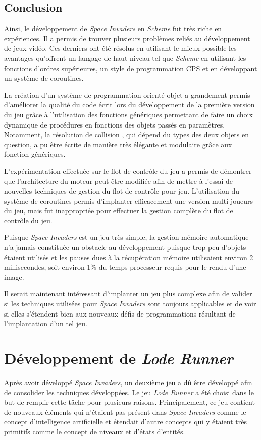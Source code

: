 \documentclass[12pt,twoside,letterpaper,francais]{book}
\newcommand{\lr}{{\textit{Lode Runner }}}
\newcommand{\si}{{\textit{Space Invaders }}}
\newcommand{\Schemelang}{{\textit{Scheme }}}
\begin{document}
\FloatBarrier
\subsection{Conclusion}
Ainsi, le développement de \si en \Schemelang fut très riche en
expériences. Il a permis de trouver plusieurs problèmes reliés au
développement de jeux vidéo. Ces derniers ont été résolus en utilisant
le mieux possible les avantages qu'offrent un langage de haut niveau
tel que \Schemelang en utilisant les fonctions d'ordres supérieures, un
style de programmation CPS et en développant un système de coroutines.

La création d'un système de programmation orienté objet a grandement
permis d'améliorer la qualité du code écrit lors du développement de
la première version du jeu grâce à l'utilisation des fonctions
génériques permettant de faire un choix dynamique de procédures en
fonctions des objets passés en paramètres. Notamment, la résolution de
collision , qui dépend du types des deux objets en question, a pu être
écrite de manière très élégante et modulaire grâce aux fonction
génériques.

L'expérimentation effectuée sur le flot de contrôle du jeu a permis de
démontrer que l'architecture du moteur peut être modifiée afin de
mettre à l'essai de nouvelles techniques de gestion du flot de
contrôle pour jeu. L'utilisation du système de coroutines permis
d'implanter efficacement une version multi-joueurs du jeu, mais fut
inappropriée pour effectuer la gestion complète du flot de contrôle du
jeu.

Puisque \si est un jeu très simple, la gestion mémoire automatique n'a
jamais constituée un obstacle au développement puisque trop peu
d'objets étaient utilisés et les pauses dues à la récupération mémoire
utilisaient environ 2 millisecondes, soit environ 1\% du temps
processeur requis pour le rendu d'une image.

Il serait maintenant intéressant d'implanter un jeu plus complexe afin
de valider si les techniques utilisées pour \si sont toujours
applicables et de voir si elles s'étendent bien aux nouveaux défis de
programmations résultant de l'implantation d'un tel jeu.


\FloatBarrier
\section{Développement de \lr} \label{Exp:ld}
Après avoir développé \textit{Space Invaders}, un deuxième jeu a dû
être développé afin de consolider les techniques
développées. Le jeu \lr a été choisi dans le but de remplir cette
tâche pour plusieurs raisons. Principalement, ce jeu contient de
nouveaux éléments qui n'étaient pas présent dans \si comme le concept
d'intelligence artificielle et étendait d'autre concepts qui y étaient
très primitifs comme le concept de niveaux et d'états d'entités.
\end{document}
